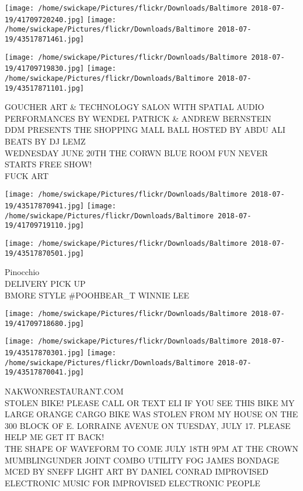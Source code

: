 \documentclass[10pt,letterpaper]{article}
\begin{document}
\texttt{[image: /home/swickape/Pictures/flickr/Downloads/Baltimore 2018-07-19/41709720240.jpg]}
\texttt{[image: /home/swickape/Pictures/flickr/Downloads/Baltimore 2018-07-19/43517871461.jpg]}

\texttt{[image: /home/swickape/Pictures/flickr/Downloads/Baltimore 2018-07-19/41709719830.jpg]}
\texttt{[image: /home/swickape/Pictures/flickr/Downloads/Baltimore 2018-07-19/43517871101.jpg]}

GOUCHER ART \& TECHNOLOGY SALON WITH SPATIAL AUDIO PERFORMANCES BY WENDEL PATRICK \& ANDREW BERNSTEIN\\
DDM PRESENTS THE SHOPPING MALL BALL HOSTED BY ABDU ALI BEATS BY DJ LEMZ\\
WEDNESDAY JUNE 20TH THE CORWN BLUE ROOM FUN NEVER STARTS FREE SHOW!\\
FUCK ART
\pagebreak

\texttt{[image: /home/swickape/Pictures/flickr/Downloads/Baltimore 2018-07-19/43517870941.jpg]}
\texttt{[image: /home/swickape/Pictures/flickr/Downloads/Baltimore 2018-07-19/41709719110.jpg]}

\texttt{[image: /home/swickape/Pictures/flickr/Downloads/Baltimore 2018-07-19/43517870501.jpg]}

Pinocchio\\
DELIVERY PICK UP\\
BMORE STYLE \#POOHBEAR\_T WINNIE LEE
\pagebreak

\texttt{[image: /home/swickape/Pictures/flickr/Downloads/Baltimore 2018-07-19/41709718680.jpg]}

\vspace{0.25in}
\texttt{[image: /home/swickape/Pictures/flickr/Downloads/Baltimore 2018-07-19/43517870301.jpg]}
\texttt{[image: /home/swickape/Pictures/flickr/Downloads/Baltimore 2018-07-19/43517870041.jpg]}

NAKWONRESTAURANT.COM\\
STOLEN BIKE!  PLEASE CALL OR TEXT ELI IF YOU SEE THIS BIKE MY LARGE ORANGE CARGO BIKE WAS STOLEN FROM MY HOUSE ON THE 300 BLOCK OF E. LORRAINE AVENUE ON TUESDAY, JULY 17.  PLEASE HELP ME GET IT BACK!\\
THE SHAPE OF WAVEFORM TO COME JULY 18TH 9PM AT THE CROWN MUMBLINGUNDER JOINT COMBO UTILITY FOG JAMES BONDAGE MCED BY SNEFF LIGHT ART BY DANIEL CONRAD IMPROVISED ELECTRONIC MUSIC FOR IMPROVISED ELECTRONIC PEOPLE
\pagebreak
\end{document}
